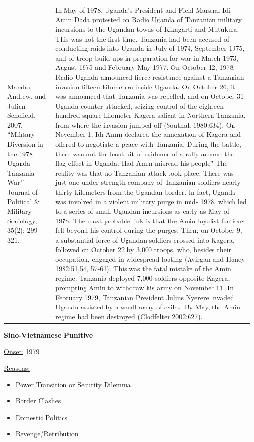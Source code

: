 {\begin{longtable}{p{}p{}}
\\
Mambo, Andrew, and Julian Schofield. 2007. “Military Diversion in the 1978 Uganda–Tanzania War.” Journal of Political \& Military Sociology, 35(2): 299–321. & In May of 1978, Uganda's President and Field Marshal Idi Amin Dada protested on Radio Uganda of Tanzanian military incursions to the Ugandan towns of Kikagarti and Mutukula. This was not the first time. Tanzania had been accused of conducting raids into Uganda in July of 1974, September 1975, and of troop build-ups in preparation for war in March 1973, August 1975 and February-May 1977. On October 12, 1978, Radio Uganda announced fierce resistance against a Tanzanian invasion fifteen kilometers inside Uganda. On October 26, it was announced that Tanzania was repelled, and on October 31 Uganda counter-attacked, seizing control of the eighteen-hundred square kilometer Kagera salient in Northern Tanzania, from where the invasion jumped-off (Southall 1980:634). On November 1, Idi Amin declared the annexation of Kagera and offered to negotiate a peace with Tanzania. During the battle, there was not the least bit of evidence of a rally-around-the-flag effect in Uganda. Had Amin misread his people? The reality was that no Tanzanian attack took place. There was just one under-strength company of Tanzanian soldiers nearly thirty kilometers from the Ugandan border. In fact, Uganda was involved in a violent military purge in mid- 1978, which led to a series of small Ugandan incursions as early as May of 1978. The most probable link is that the Amin loyalist factions fell beyond his control during the purges. Then, on October 9, a substantial force of Ugandan soldiers crossed into Kagera, followed on October 22 by 3,000 troops, who, besides their occupation, engaged in widespread looting (Avirgan and Honey 1982:51,54, 57-61). This was the fatal mistake of the Amin regime. Tanzania deployed 7,000 soldiers opposite Kagera, prompting Amin to withdraw his army on November 11. In February 1979, Tanzanian President Julius Nyerere invaded Uganda assisted by a small army of exiles. By May, the Amin regime had been destroyed (Clodfelter 2002:627).
\\
\end{longtable}}
\clearpage
         \textbf{Sino-Vietnamese Punitive} 

          \underline{Onset:} 1979         

\underline{Reasons:}
\begin{itemize}
\item Power Transition or Security Dilemma
\item Border Clashes
\item Domestic Politics
\item Revenge/Retribution
\end{itemize}

